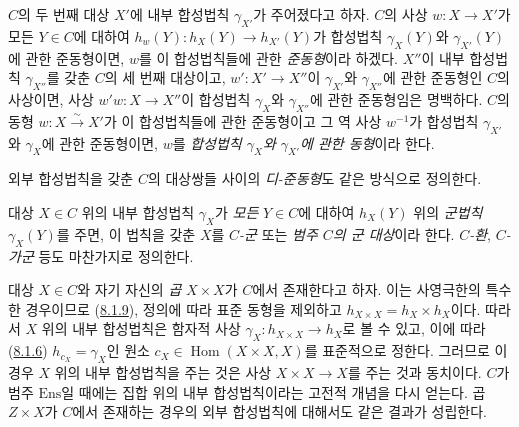 \begin{env}[8.2.2]
\label{0.8.2.2-ko}
$C$의 두 번째 대상 $X'$에 내부 합성법칙 $\gamma_{X'}$가 주어졌다고
하자. $C$의 사상 $w:X\to X'$가 모든 $Y\in C$에 대하여
$h_w(Y):h_X(Y)\to h_{X'}(Y)$가 합성법칙 $\gamma_X(Y)$와
$\gamma_{X'}(Y)$에 관한 준동형이면, $w$를 이 합성법칙들에 관한
\emph{준동형}이라 하겠다. $X''$이 내부 합성법칙 $\gamma_{X''}$를 갖춘
$C$의 세 번째
대상이고, $w':X'\to X''$이 $\gamma_{X'}$와 $\gamma_{X''}$에 관한
준동형인 $C$의 사상이면, 사상 $w'w:X\to X''$이 합성법칙
$\gamma_X$와 $\gamma_{X''}$에 관한 준동형임은 명백하다. $C$의 동형
$w:X\xrightarrow{\sim}X'$가 이 합성법칙들에 관한 준동형이고 그 역 사상
$w^{-1}$가 합성법칙 $\gamma_{X'}$와 $\gamma_X$에 관한 준동형이면,
$w$를 \emph{합성법칙 $\gamma_X$와 $\gamma_{X'}$에 관한 동형}이라 한다.

외부 합성법칙을 갖춘 $C$의 대상쌍들 사이의 \emph{디-준동형}도 같은
방식으로 정의한다.
\end{env}

\begin{env}[8.2.3]
\label{0.8.2.3-ko}
대상 $X\in C$ 위의 내부 합성법칙 $\gamma_X$가 \emph{모든}
$Y\in C$에 대하여 $h_X(Y)$ 위의 \emph{군법칙} $\gamma_X(Y)$를 주면,
이 법칙을 갖춘 $X$를 \emph{$C$-군} 또는 \emph{범주 $C$의 군 대상}이라
한다. \emph{$C$-환}, \emph{$C$-가군} 등도 마찬가지로 정의한다.
\end{env}

\begin{env}[8.2.4]
\label{0.8.2.4-ko}
대상 $X\in C$와 자기 자신의 \emph{곱} $X\times X$가 $C$에서
존재한다고 하자. 이는 사영극한의 특수한 경우이므로
(\hyperref[0.8.1.9-fr]{8.1.9}), 정의에 따라 표준 동형을 제외하고
$h_{X\times X}=h_X\times h_X$이다. 따라서 $X$ 위의 내부 합성법칙은
함자적 사상 $\gamma_X:h_{X\times X}\to h_X$로 볼 수 있고, 이에 따라
(\hyperref[0.8.1.6-fr]{8.1.6}) $h_{c_X}=\gamma_X$인 원소
$c_X\in\operatorname{Hom}(X\times X,X)$를 표준적으로 정한다. 그러므로
이 경우 $X$ 위의 내부 합성법칙을 주는 것은 사상 $X\times X\to X$를
주는 것과 동치이다. $C$가 범주 $\mathrm{Ens}$일 때에는 집합 위의 내부
합성법칙이라는 고전적 개념을 다시 얻는다. 곱 $Z\times X$가 $C$에서
존재하는 경우의 외부 합성법칙에 대해서도 같은 결과가 성립한다.
\end{env}

